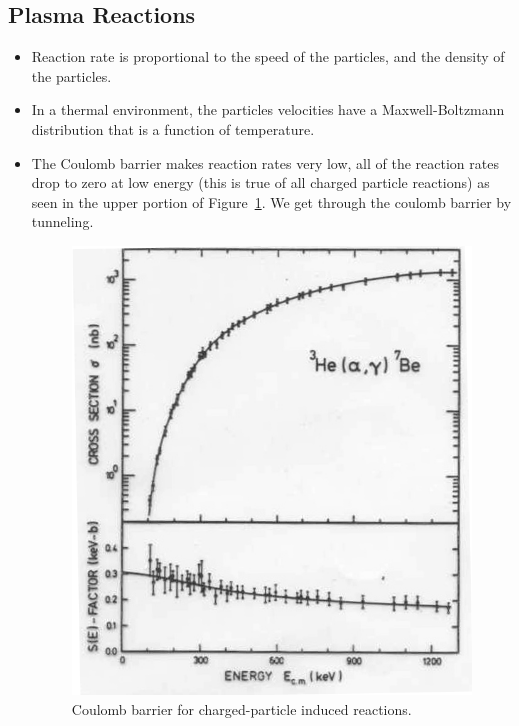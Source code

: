 \documentclass[letter]{article}
\begin{document}
\subsection{Plasma Reactions}
\begin{itemize}
\item Reaction rate is proportional to the speed of the particles, and
  the density of the particles.~\cite[Lec 28]{lecture}
\item In a thermal environment, the particles velocities have a
  Maxwell-Boltzmann distribution that is a function of
  temperature.~\cite[Lec 28]{lecture}
\item The Coulomb barrier makes reaction rates very low, all of the
  reaction rates drop to zero at low energy (this is true of all
  charged particle reactions) as seen in the upper portion of
  Figure~\ref{fig:charged_xsec}. We get through the coulomb barrier by
  tunneling.~\cite[Lec 28]{lecture}
  \begin{figure}[hbtp]
    \centering
    \includegraphics[scale=0.5]{images/charged_cross_section}
    \caption{Coulomb barrier for charged-particle induced
      reactions.~\cite[Lec. 28]{lecture}}
    \label{fig:charged_xsec}
  \end{figure}

\end{itemize}
\end{document}
